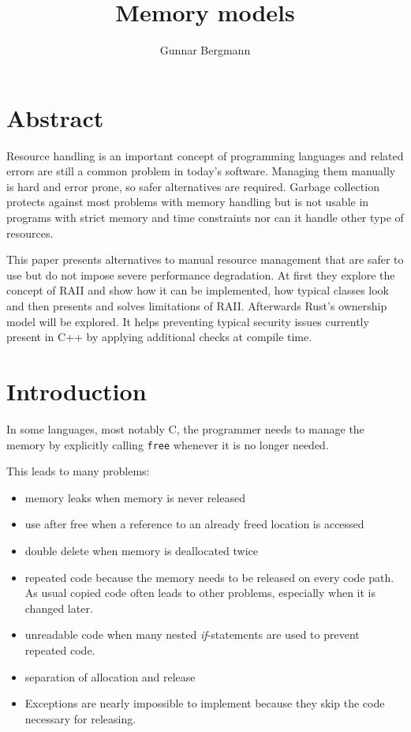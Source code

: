 \documentclass[conference,twocolumn]{IEEEtran}
\title{Memory models}
\author{Gunnar Bergmann}
\begin{document}
	
\maketitle

\section{Abstract}
Resource handling is an important concept of programming languages and related errors are still a common problem in today's software. Managing them manually is hard and error prone, so safer alternatives are required. Garbage collection protects against most problems with memory handling but is not usable in programs with strict memory and time constraints nor can it handle other type of resources.

This paper presents alternatives to manual resource management that are safer to use but do not impose severe performance degradation. At first they explore the concept of RAII and show how it can be implemented, how typical classes look and then presents and solves limitations of RAII. Afterwards Rust's ownership model will be explored. It helps preventing typical security issues currently present in C++ by applying additional checks at compile time.

\section{Introduction}
In some languages, most notably C, the programmer needs to manage the memory by explicitly calling \verb|free| whenever it is no longer needed.

This leads to many problems:
\begin{itemize}
    \item memory leaks when memory is never released
    \item use after free when a reference to an already freed location is accessed
    \item double delete when memory is deallocated twice
    \item repeated code because the memory needs to be released on every code path. As usual copied code often leads to other problems, especially when it is changed later.
    \item unreadable code when many nested \emph{if}-statements are used to prevent repeated code.
    \item separation of allocation and release
    \item Exceptions are nearly impossible to implement because they skip the code necessary for releasing.
\end{itemize}
\end{document}
